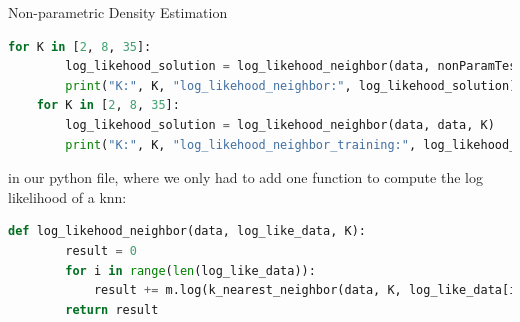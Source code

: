 \documentclass[
ngerman,
]{tudaexercise}
\begin{document}
\begin{task}{Non-parametric Density Estimation}
\begin{subtask}
\begin{lstlisting}[language=Python]
	for K in [2, 8, 35]:
		log_likehood_solution = log_likehood_neighbor(data, nonParamTest, K)
		print("K:", K, "log_likehood_neighbor:", log_likehood_solution)
	for K in [2, 8, 35]:
		log_likehood_solution = log_likehood_neighbor(data, data, K)
		print("K:", K, "log_likehood_neighbor_training:", log_likehood_solution)
	\end{lstlisting}
	in our python file, where we only had to add one function to compute the log likelihood of a knn:
	\begin{lstlisting}[language=Python]
	def log_likehood_neighbor(data, log_like_data, K):
		result = 0 
		for i in range(len(log_like_data)):
			result += m.log(k_nearest_neighbor(data, K, log_like_data[i]))
		return result
	\end{lstlisting}
\end{subtask}
\end{task}
	
\end{document}
